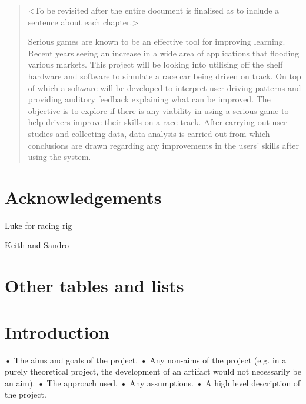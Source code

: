 \documentclass{article}
\begin{document}
\newpage
\begin{abstract}

<To be revisited after the entire document is finalised as to include a sentence about each chapter.>

Serious games are known to be an effective tool for improving learning. Recent years seeing an increase in a wide area of applications that flooding various markets. This project will be looking into utilising off the shelf hardware and software to simulate a race car being driven on track. On top of which a software will be developed to interpret user driving patterns and providing auditory feedback explaining what can be improved. The objective is to explore if there is any viability in using a serious game to help drivers improve their skills on a race track. After carrying out user studies and collecting data, data analysis is carried out from which conclusions are drawn regarding any improvements in the users' skills after using the system.

\end{abstract}

\newpage
\section{Acknowledgements}

Luke for racing rig

Keith and Sandro

\newpage
\tableofcontents

\newpage
\section{Other tables and lists}
\listoffigures

\newpage
\section{Introduction}

• The aims and goals of the project.
• Any non-aims of the project (e.g. in a purely theoretical project, the development of an artifact would not necessarily be an aim).
• The approach used.
• Any assumptions.
• A high level description of the project.
\end{document}
